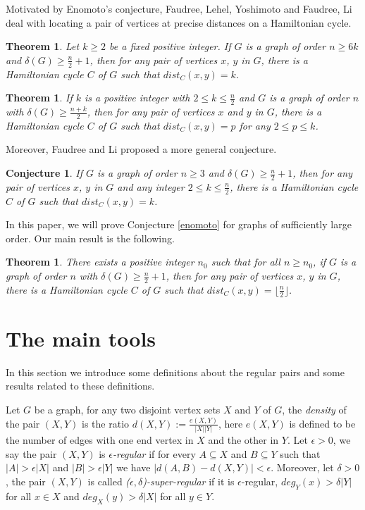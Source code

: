 \documentclass[11pt]{article}
\newtheorem{theorem}[lemma]{Theorem}
\newtheorem{conjecture}[lemma]{Conjecture}
\begin{document}
Motivated by Enomoto's conjecture, Faudree, Lehel, Yoshimoto \cite{faudree} and Faudree, Li \cite{li} deal with locating a pair of vertices at precise distances on a Hamiltonian cycle.

\begin{theorem}\cite{faudree}
Let $k\geq 2$ be a fixed positive integer. If $G$ is a graph of order $n\geq 6k$ and $\delta (G)\geq \frac{n}{2}+1$, then for any pair of vertices $x$, $y$ in $G$, there is a Hamiltonian cycle $C$ of $G$ such that $dist_C(x,y)=k$.
\end{theorem}

\begin{theorem}\cite{li}
If $k$ is a positive integer with $2\leq k\leq \frac{n}{2}$ and $G$ is a graph of order $n$ with  $\delta (G)\geq \frac{n+k}{2}$, then for any pair of vertices $x$ and $y$ in $G$, there is a Hamiltonian cycle $C$ of $G$ such that $dist_C(x,y)=p$ for any $2\leq p\leq k$.
\end{theorem}

Moreover, Faudree and Li \cite{li} proposed a more general conjecture.

\begin{conjecture}\cite{li}\label{li}
If $G$ is a graph of order $n\geq 3$ and $\delta(G)\geq \frac{n}{2}+1$, then for any pair of vertices $x$, $y$ in $G$ and any integer $2\leq k\leq \frac{n}{2}$, there is a Hamiltonian cycle $C$ of $G$ such that $dist_C(x,y)=k$.
\end{conjecture}

In this paper, we will prove Conjecture \ref{enomoto} for graphs of sufficiently large order. Our main result is the following.

\begin{theorem}\label{main}
There exists a positive integer $n_0$ such that for all $n\geq n_0$, if $G$ is a graph of order $n$ with $\delta(G)\geq \frac{n}{2}+1$, then for any pair of vertices $x$, $y$ in $G$, there is a Hamiltonian cycle $C$ of $G$ such that $dist_C(x,y)=\lfloor \frac{n}{2}\rfloor$.
\end{theorem}

\section{The main tools}

In this section we introduce some definitions about the regular pairs and some results related to these definitions.

Let $G$ be a graph, for any two disjoint vertex sets $X$ and $Y$ of $G$, the {\em density} of the pair $(X,Y)$ is the ratio $d(X,Y):=\frac{e(X,Y)}{|X||Y|}$, here $e(X,Y)$ is defined to be the number of edges with one end vertex in $X$ and the other in $Y$. Let $\epsilon >0$, we say the pair $(X,Y)$ is {\em $\epsilon $-regular} if for every $A\subseteq X$ and $B\subseteq Y$ such that $|A|>\epsilon |X|$ and $|B|>\epsilon |Y|$ we have $|d(A,B)-d(X,Y)|<\epsilon $. Moreover, let $\delta >0$, the pair $(X,Y)$ is called {\em ($\epsilon ,\delta$)-super-regular} if it is $\epsilon $-regular, $deg_Y(x)>\delta |Y|$ for all $x\in X$ and $deg_X(y)>\delta |X|$ for all $y\in Y$.
\end{document}
